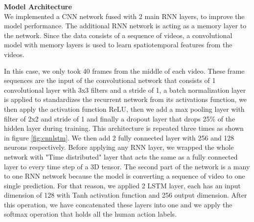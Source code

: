 \documentclass{vldb}
\begin{document}
\textbf{Model Architecture}\\

We implemented a CNN network fused with 2 main RNN layers, to improve the model performance. The additional RNN network is acting as a memory layer to the network. Since the data consists of a sequence of videos, a convolutional model with memory layers is used to learn spatiotemporal features from the videos.

In this case, we only took 40 frames from the middle of each video. These frame sequences are the input of the convolutional network that consists of 1 convolutional layer with 3x3 filters and a stride of 1,  a batch normalization layer is applied to standardizes the recurrent network from its activations function, we then apply the activation function ReLU, then we add a max pooling layer with filter of 2x2 and stride of 1 and finally a dropout layer that drops 25\% of the hidden layer during training. This architecture is repeated three times as shown in figure \ref{fig:cnnlstm}. We then add 2 fully connected layer with 256 and 128 neurons respectively. Before applying any RNN layer, we wrapped the whole network with "Time distributed" layer that acts the same as a fully connected layer to every time step of a 3D tensor. The second part of the network is a many to one RNN network because the model is converting a sequence of video to one single prediction. For that reason, we applied 2 LSTM layer, each has an input dimension of 128 with Tanh activation function and 256 output dimension. After this operation, we have concatenated these layers into one and we apply the softmax operation that holds all the human action labels.
\end{document}
